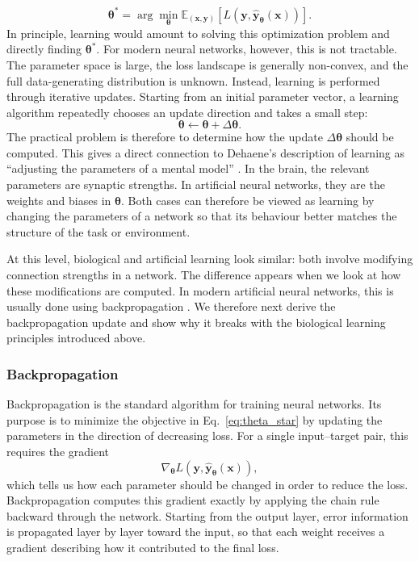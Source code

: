\begin{equation}
    \boldsymbol{\theta}^\ast
    =
    \arg\min_{\boldsymbol{\theta}}
    \mathbb{E}_{(\mathbf{x},\mathbf{y})}
    \left[
        L\!\left(\mathbf{y},\hat{\mathbf{y}}_{\boldsymbol{\theta}}(\mathbf{x})\right)
    \right].
    \label{eq:theta_star}
\end{equation}
In principle, learning would amount to solving this optimization problem and directly finding \(\boldsymbol{\theta}^\ast\). For modern neural networks, however, this is not tractable. The parameter space is large, the loss landscape is generally non-convex, and the full data-generating distribution is unknown. Instead, learning is performed through iterative updates. Starting from an initial parameter vector, a learning algorithm repeatedly chooses an update direction and takes a small step:
\[
    \boldsymbol{\theta} \leftarrow \boldsymbol{\theta} + \Delta \boldsymbol{\theta}.
\]
The practical problem is therefore to determine how the update \(\Delta\boldsymbol{\theta}\) should be computed. This gives a direct connection to Dehaene's description of learning as ``adjusting the parameters of a mental model'' \parencite{dehaene_how_2021}. In the brain, the relevant parameters are synaptic strengths. In artificial neural networks, they are the weights and biases in \(\boldsymbol{\theta}\). Both cases can therefore be viewed as learning by changing the parameters of a network so that its behaviour better matches the structure of the task or environment.

At this level, biological and artificial learning look similar: both involve modifying connection strengths in a network. The difference appears when we look at how these modifications are computed. In modern artificial neural networks, this is usually done using backpropagation \parencite{rumelhart_learning_1986}. We therefore next derive the backpropagation update and show why it breaks with the biological learning principles introduced above.

\subsubsection{Backpropagation}

Backpropagation \parencite{rumelhart_learning_1986} is the standard algorithm for training neural networks. Its purpose is to minimize the objective in Eq.~\eqref{eq:theta_star} by updating the parameters in the direction of decreasing loss. For a single input--target pair, this requires the gradient
\begin{equation}
    \nabla_{\boldsymbol{\theta}} L(\mathbf{y}, \hat{\mathbf{y}}_{\boldsymbol{\theta}}(\mathbf{x})),
    \label{eq:backprop_gradient}
\end{equation}
which tells us how each parameter should be changed in order to reduce the loss. Backpropagation computes this gradient exactly by applying the chain rule backward through the network. Starting from the output layer, error information is propagated layer by layer toward the input, so that each weight receives a gradient describing how it contributed to the final loss.


